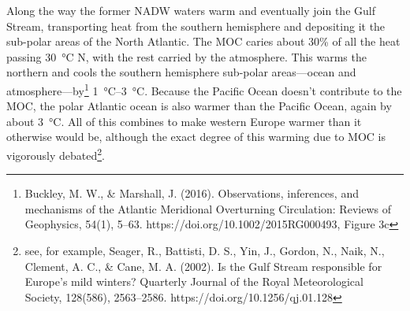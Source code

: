 \documentclass[amstex,12pt]{book}
\begin{document}
{Along the way the former NADW waters warm and eventually join the Gulf Stream, transporting heat from the southern hemisphere and depositing it the sub-polar areas of the North Atlantic. The MOC caries about 30\% of all the heat passing \SI{30}{\celsius} N, with the rest carried by the atmosphere. This warms the northern and cools the southern hemisphere sub-polar areas---ocean and atmosphere---by\footnote{Buckley, M. W., \& Marshall, J. (2016). Observations, inferences, and mechanisms of the Atlantic Meridional Overturning Circulation: Reviews of Geophysics, 54(1), 5–63. https://doi.org/10.1002/2015RG000493, Figure 3c} \SIrange{1}{3}{\celsius}. Because the Pacific Ocean doesn't contribute to the MOC, the polar Atlantic ocean is also warmer than the Pacific Ocean, again by about \SI{3}{\celsius}. All of this combines to make western Europe warmer than it otherwise would be, although the exact degree of this warming due to MOC is vigorously debated\footnote{see, for example, Seager, R., Battisti, D. S., Yin, J., Gordon, N., Naik, N., Clement, A. C., \& Cane, M. A. (2002). Is the Gulf Stream responsible for Europe's mild winters? Quarterly Journal of the Royal Meteorological Society, 128(586), 2563–2586. https://doi.org/10.1256/qj.01.128}.  \\

}
\end{document}
